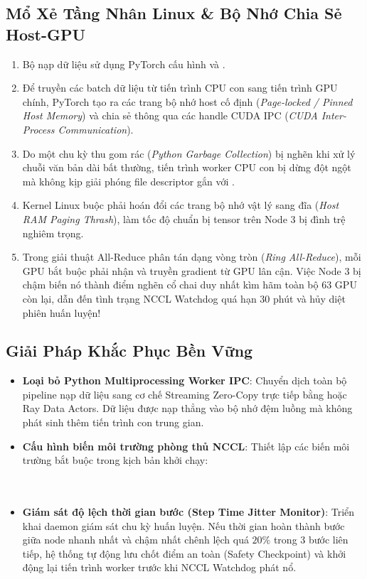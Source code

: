 \subsection{Mổ Xẻ Tầng Nhân Linux \& Bộ Nhớ Chia Sẻ Host-GPU}
\begin{enumerate}
  \item Bộ nạp dữ liệu sử dụng PyTorch  cấu hình  và .
  \item Để truyền các batch dữ liệu từ tiến trình CPU con sang tiến trình GPU chính, PyTorch tạo ra các trang bộ nhớ host cố định (\textit{Page-locked / Pinned Host Memory}) và chia sẻ thông qua các handle CUDA IPC (\textit{CUDA Inter-Process Communication}).
  \item Do một chu kỳ thu gom rác (\textit{Python Garbage Collection}) bị nghẽn khi xử lý chuỗi văn bản dài bất thường, tiến trình worker CPU con bị dừng đột ngột mà không kịp giải phóng file descriptor gắn với .
  \item Kernel Linux buộc phải hoán đổi các trang bộ nhớ vật lý sang đĩa (\textit{Host RAM Paging Thrash}), làm tốc độ chuẩn bị tensor trên Node 3 bị đình trệ nghiêm trọng.
  \item Trong giải thuật All-Reduce phân tán dạng vòng tròn (\textit{Ring All-Reduce}), mỗi GPU bắt buộc phải nhận và truyền gradient từ GPU lân cận. Việc Node 3 bị chậm biến nó thành điểm nghẽn cổ chai duy nhất kìm hãm toàn bộ 63 GPU còn lại, dẫn đến tình trạng NCCL Watchdog quá hạn 30 phút và hủy diệt phiên huấn luyện!
\end{enumerate}

\subsection{Giải Pháp Khắc Phục Bền Vững}
\begin{itemize}
  \item \textbf{Loại bỏ Python Multiprocessing Worker IPC}: Chuyển dịch toàn bộ pipeline nạp dữ liệu sang cơ chế Streaming Zero-Copy trực tiếp bằng  hoặc Ray Data Actors. Dữ liệu được nạp thẳng vào bộ nhớ đệm luồng mà không phát sinh thêm tiến trình con trung gian.
  \item \textbf{Cấu hình biến môi trường phòng thủ NCCL}:
    Thiết lập các biến môi trường bắt buộc trong kịch bản khởi chạy:\\
    \\
    \\
  \item \textbf{Giám sát độ lệch thời gian bước (Step Time Jitter Monitor)}:
    Triển khai daemon giám sát chu kỳ huấn luyện. Nếu thời gian hoàn thành bước giữa node nhanh nhất và chậm nhất chênh lệch quá $20\%$ trong 3 bước liên tiếp, hệ thống tự động lưu chốt điểm an toàn (Safety Checkpoint) và khởi động lại tiến trình worker trước khi NCCL Watchdog phát nổ.
\end{itemize}

